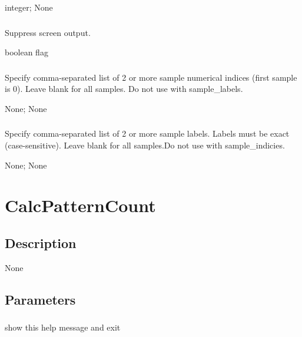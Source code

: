 \documentclass[letterpaper,11pt,english]{sphinxmanual}
\begin{document}
 integer;  None


\subsubsection{}
\label{\detokenize{prog_desc:id64}}
 Suppress screen output.

 boolean flag


\subsubsection{}
\label{\detokenize{prog_desc:id65}}
 Specify comma-separated list of 2 or more sample numerical indices (first sample is 0). Leave blank for all samples. Do not use with \textendash{}sample\_labels.

 None;  None


\subsubsection{}
\label{\detokenize{prog_desc:id66}}
 Specify comma-separated list of 2 or more sample labels. Labels must be exact (case-sensitive). Leave blank for all samples.Do not use with \textendash{}sample\_indicies.

 None;  None


\section{CalcPatternCount}
\label{\detokenize{prog_desc:calcpatterncount}}

\subsection{Description}
\label{\detokenize{prog_desc:id67}}
None


\subsection{Parameters}
\label{\detokenize{prog_desc:id68}}

\subsubsection{}
\label{\detokenize{prog_desc:id69}}
 show this help message and exit
\end{document}
